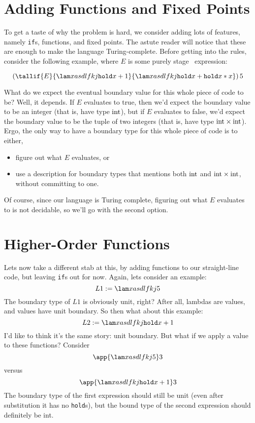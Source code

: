 \documentclass[]{article}
\newcommand {\next}{asdlfkj}
\begin{document}
\begin{abstrsyn}
\section{Adding Functions and Fixed Points}

To get a taste of why the problem is hard,
we consider adding lots of features, namely \texttt{if}s, functions, and fixed points.
The astute reader will notice that these are enough to make the language Turing-complete.
Before getting into the rules, consider the following example, 
where $E$ is some purely stage \bbone\ expression:

\[
\left(
\tallif {E}
	{\lam x {\next{\pause{x}+1}}}
	{\lam x {\next{\pause{x}+\pause{x*x}}}}
\right ) 5
\]

What do we expect the eventual boundary value for this whole piece of code to be?
Well, it depends. 
If $E$ evaluates to true, then we'd expect the boundary value to be an integer (that is, have type ${\rm int}$),
but if $E$ evaluates to false, we'd expect the boundary value to be the tuple of two integers (that is, have type ${\rm int} \times {\rm int}$).
Ergo, the only way to have a boundary type for this whole piece of code is to either,
\begin{itemize}
\item figure out what $E$ evaluates, or
\item use a description for boundary types that mentions both ${\rm int}$ and ${\rm int} \times {\rm int}$, 
without committing to one.
\end{itemize}

Of course, since our language is Turing complete, figuring out what $E$ evaluates to is not decidable,
so we'll go with the second option.

\section{Higher-Order Functions}
\label{sec:higherorder}

Lets now take a different stab at this, by adding functions to our straight-line code,
but leaving \texttt{if}s out for now.
Again, lets consider an example:
\[
L1 := \lam x {\next{5}}
\]
The boundary type of $L1$ is obviously unit, right?
After all, lambdas are values, and values have unit boundary.
So then what about this example:
\[
L2 := \lam x {\next{\pause{x}+1}}
\]
I'd like to think it's the same story: unit boundary.
But what if we apply a value to these functions?
Consider
\[
\app {\lam x {\next{5}}} 3
\]
versus
\[
\app {\lam x {\next{\pause{x}+1}}} 3
\]
The boundary type of the first expression should still be unit 
(even after substitution it has no {\tt hold}s),
but the bound type of the second expression should definitely be int.


\end{abstrsyn}
\end{document}
